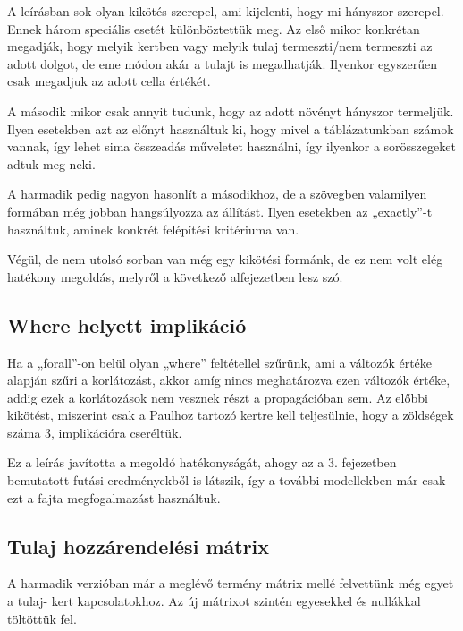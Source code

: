 \documentclass[12pt,a4paper,twoside, openright]{report}
\begin{document}
				
				A leírásban sok olyan kikötés szerepel, ami kijelenti, hogy mi hányszor szerepel. Ennek három speciális esetét különböztettük meg. Az első mikor konkrétan megadják, hogy melyik kertben vagy melyik tulaj termeszti/nem termeszti az adott dolgot, de eme módon akár a tulajt is megadhatják.  Ilyenkor egyszerűen csak megadjuk az adott cella értékét.
				
				
				A második mikor csak annyit tudunk, hogy az adott növényt hányszor termeljük. Ilyen 
				esetekben azt az előnyt használtuk ki, hogy mivel a táblázatunkban számok vannak, így 
				lehet sima összeadás műveletet használni, így ilyenkor a sorösszegeket adtuk meg neki.
				
				
				A harmadik pedig nagyon hasonlít a másodikhoz, de a szövegben valamilyen formában 
				még jobban hangsúlyozza az állítást. Ilyen esetekben az „exactly”-t használtuk, aminek 
				konkrét felépítési kritériuma van.
				
				
				Végül, de nem utolsó sorban van még egy kikötési formánk, de ez nem volt elég hatékony 
				megoldás, melyről a következő alfejezetben lesz szó.
				
				
			\subsection{Where helyett implikáció}
				Ha a „forall”-on belül olyan „where” feltétellel szűrünk, ami a változók értéke alapján szűri a korlátozást, akkor amíg nincs meghatározva ezen változók értéke, addig ezek a korlátozások nem vesznek részt a propagációban sem. Az előbbi kikötést, miszerint csak a Paulhoz tartozó kertre kell teljesülnie, hogy a zöldségek száma 3, implikációra cseréltük.
				
				
				Ez a leírás javította a megoldó hatékonyságát, ahogy az a 3. fejezetben bemutatott futási 
				eredményekből is látszik, így a további modellekben már csak ezt a fajta megfogalmazást 
				használtuk. 
				
			\subsection{Tulaj hozzárendelési mátrix}
				A harmadik verzióban már a meglévő termény mátrix mellé felvettünk még egyet a tulaj-
				kert kapcsolatokhoz. Az új mátrixot szintén egyesekkel és nullákkal töltöttük fel.
				
\end{document}
